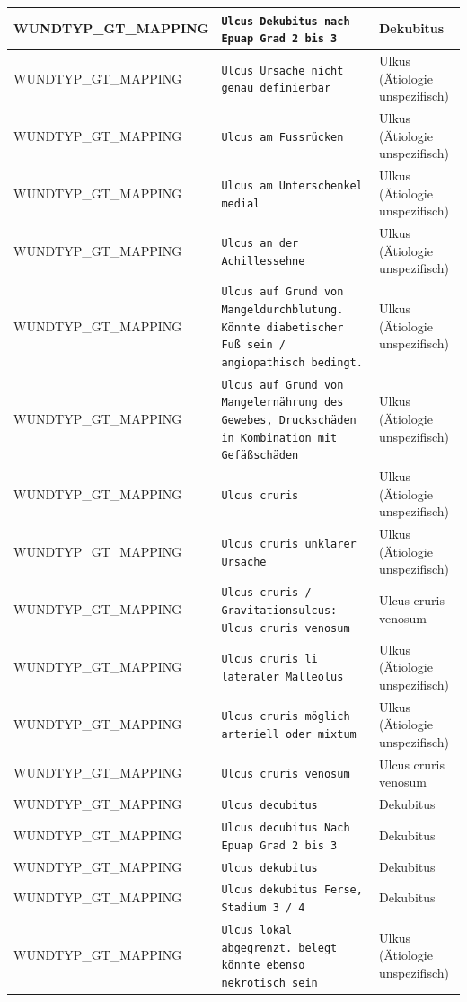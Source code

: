 \begin{longtable}{|p{3.5cm}|p{5cm}|p{6.5cm}|}
WUNDTYP\_GT\_MAPPING & \texttt{Ulcus Dekubitus nach Epuap Grad 2 bis 3} & Dekubitus \\ \hline
WUNDTYP\_GT\_MAPPING & \texttt{Ulcus Ursache nicht genau definierbar} & Ulkus (Ätiologie unspezifisch) \\ \hline
WUNDTYP\_GT\_MAPPING & \texttt{Ulcus am Fussrücken} & Ulkus (Ätiologie unspezifisch) \\ \hline
WUNDTYP\_GT\_MAPPING & \texttt{Ulcus am Unterschenkel medial} & Ulkus (Ätiologie unspezifisch) \\ \hline
WUNDTYP\_GT\_MAPPING & \texttt{Ulcus an der Achillessehne} & Ulkus (Ätiologie unspezifisch) \\ \hline
WUNDTYP\_GT\_MAPPING & \texttt{Ulcus auf Grund von Mangeldurchblutung. Könnte diabetischer Fuß sein / angiopathisch bedingt.} & Ulkus (Ätiologie unspezifisch) \\ \hline
WUNDTYP\_GT\_MAPPING & \texttt{Ulcus auf Grund von Mangelernährung des Gewebes, Druckschäden in Kombination mit Gefäßschäden} & Ulkus (Ätiologie unspezifisch) \\ \hline
WUNDTYP\_GT\_MAPPING & \texttt{Ulcus cruris} & Ulkus (Ätiologie unspezifisch) \\ \hline
WUNDTYP\_GT\_MAPPING & \texttt{Ulcus cruris  unklarer Ursache} & Ulkus (Ätiologie unspezifisch) \\ \hline
WUNDTYP\_GT\_MAPPING & \texttt{Ulcus cruris /  Gravitationsulcus: Ulcus cruris venosum} & Ulcus cruris venosum \\ \hline
WUNDTYP\_GT\_MAPPING & \texttt{Ulcus cruris li lateraler Malleolus} & Ulkus (Ätiologie unspezifisch) \\ \hline
WUNDTYP\_GT\_MAPPING & \texttt{Ulcus cruris möglich arteriell oder mixtum} & Ulkus (Ätiologie unspezifisch) \\ \hline
WUNDTYP\_GT\_MAPPING & \texttt{Ulcus cruris venosum} & Ulcus cruris venosum \\ \hline
WUNDTYP\_GT\_MAPPING & \texttt{Ulcus decubitus} & Dekubitus \\ \hline
WUNDTYP\_GT\_MAPPING & \texttt{Ulcus decubitus Nach Epuap Grad 2 bis 3} & Dekubitus \\ \hline
WUNDTYP\_GT\_MAPPING & \texttt{Ulcus dekubitus} & Dekubitus \\ \hline
WUNDTYP\_GT\_MAPPING & \texttt{Ulcus dekubitus Ferse,  Stadium 3 / 4} & Dekubitus \\ \hline
WUNDTYP\_GT\_MAPPING & \texttt{Ulcus lokal abgegrenzt. belegt könnte ebenso nekrotisch sein} & Ulkus (Ätiologie unspezifisch) \\ \hline

\end{longtable}
